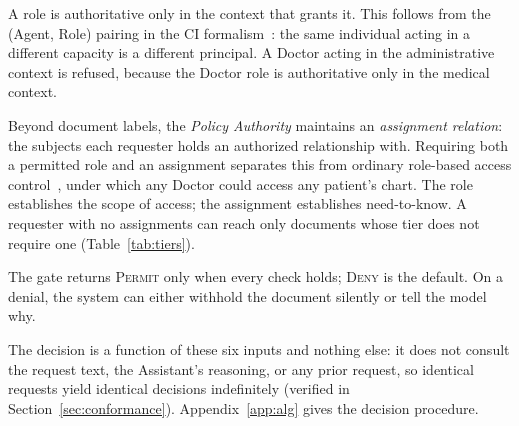 A role is authoritative only in the context that grants it. This follows from
the (Agent, Role) pairing in the CI formalism~\cite{barth2006}: the same
individual acting in a different capacity is a different principal. A Doctor
acting in the administrative context is refused, because the Doctor role is
authoritative only in the medical context.

Beyond document labels, the {\em Policy Authority} maintains an
\textit{assignment relation}: the subjects each requester holds an authorized
relationship with. Requiring both a permitted role and an assignment separates
this from ordinary role-based access control~\cite{sandhu1996}, under which any
Doctor could access any patient's chart. The role establishes the scope of
access; the assignment establishes need-to-know. A requester with no
assignments can reach only documents whose tier does not require one
(Table~\ref{tab:tiers}).

\begin{table}[t]
\centering
\caption{Sensitivity tiers and whether each requires an assignment.
\texttt{public} and \texttt{internal} documents concern the organization, so
there is no subject to be assigned.}
\label{tab:tiers}
\footnotesize
{}
\end{table}

The gate returns \textsc{Permit} only when every check holds; \textsc{Deny} is
the default. On a denial, the system can either withhold the document silently
or tell the model why.

The decision is a function of these six inputs and nothing else: it does not
consult the request text, the Assistant's reasoning, or any prior request, so
identical requests yield identical decisions indefinitely (verified in
Section~\ref{sec:conformance}). Appendix~\ref{app:alg} gives the decision
procedure.